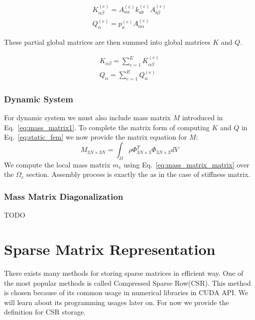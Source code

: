 \documentclass[en]{minipw} %
\begin{document}
\begin{equation}
\begin{aligned}
K^{(e)}_{\alpha \beta} =  A^{(e)}_{a \alpha} k^{(e)}_{a b} A^{(e)}_{b \beta}
\\
Q^{(e)}_{\alpha} =  p^{(e)}_{a} A^{(e)}_{a \alpha}
\end{aligned}
\end{equation}

These partial global matrices are then summed into global matrices $K$ and $Q$.

\begin{equation}
\begin{aligned}
K_{\alpha \beta} =  \sum^{E}_{e=1} K^{(e)}_{\alpha \beta}
\\
Q_{\alpha} =  \sum^{E}_{e=1} Q^{(e)}_{\alpha}
\end{aligned}
\end{equation}

\subsubsection{Dynamic System}
For dynamic system we must also include mass matrix $M$ introduced in Eq.~\ref{eq:mass_matrix1}. To complete the matrix form of computing $K$ and $Q$ in Eq.~\ref{eq:static_fem} we now provide the matrix equation for $M$:
\begin{equation}
\label{eq:mass_matrix_matrix}
M_{3N \times 3N} =  \int_{\Omega} \rho \Phi^{T}_{3N \times 3} \Phi_{3N \times 3} dV
\end{equation}
We compute the local mass matrix $m_{e}$ using Eq.~\ref{eq:mass_matrix_matrix} over the $\Omega_{e}$ section. Assembly process is exactly the as in the case of stiffness matrix.

\subsubsection{Mass Matrix Diagonalization}
TODO

\section{Sparse Matrix Representation}
There exists many methods for storing sparse matrices in efficient way. One of the most popular methods is called Compressed Sparse Row(CSR). This method is chosen because of its common usage in numerical libraries in CUDA API. We will learn about its programming usages later on. For now we provide the definition for CSR storage.
\end{document}
